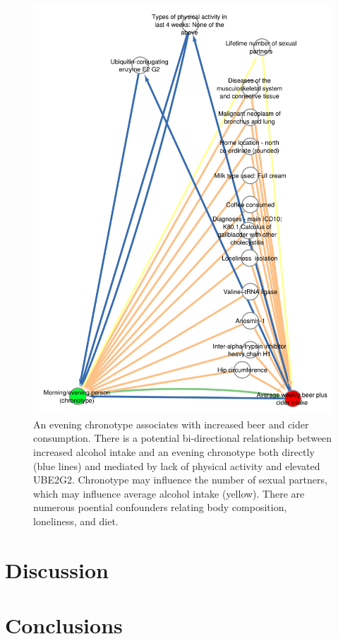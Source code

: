 \documentclass[journal,article,submit,moreauthors,pdftex]{Definitions/mdpi}
\begin{document}
\begin{figure}[htbp]
	\centering
	\includegraphics[width=0.5\linewidth]{Figs/Analysis3/chronoBeer.png}
	\caption{An evening chronotype associates with increased beer and cider consumption. There is a potential bi-directional relationship between increased alcohol intake and an evening chronotype both directly (blue lines) and mediated by lack of physical activity and elevated UBE2G2. Chronotype may influence the number of sexual partners, which may influence average alcohol intake (yellow). There are numerous poential confounders relating body composition, loneliness, and diet.}
	\label{chronoBipolar}
\end{figure}





\section{Discussion}



\section{Conclusions}




\end{document}
